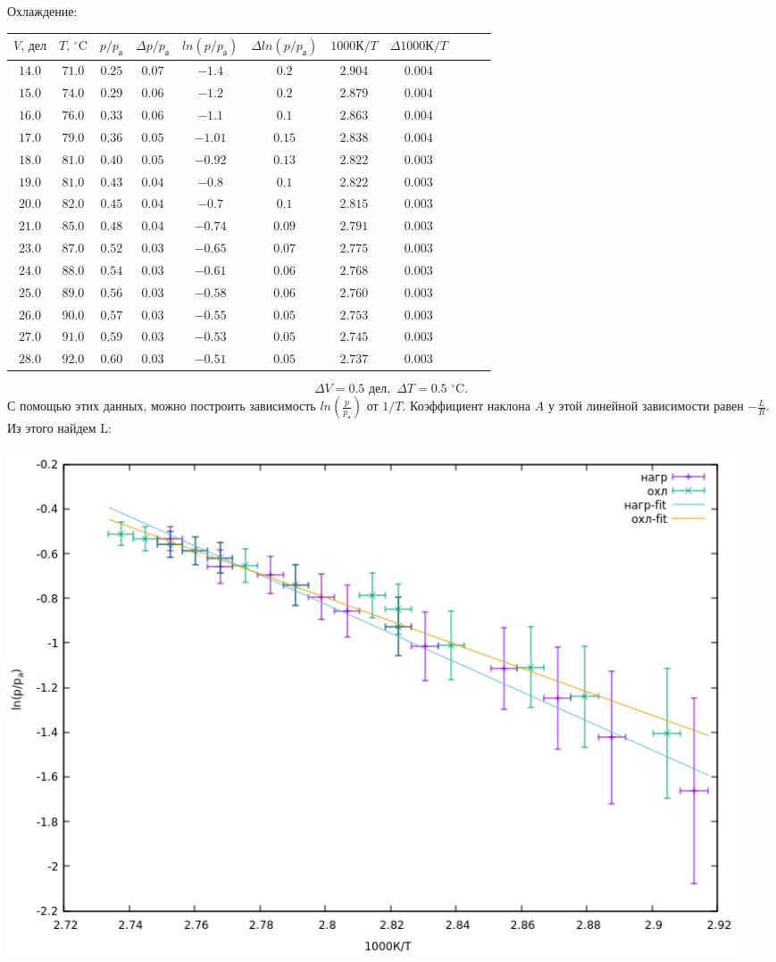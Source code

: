 Охлаждение:
\begin{center}
\begin{tabular}{|c|c|c|c|c|c|c|c|c|c|c|}\hline
$V,\,\text{дел}$&$T,\,^\circ\text{C}$&$p/p_\text{а}$&$\Delta p/p_\text{а}$
&$ln(p/p_\text{а})$&$\Delta ln(p/p_\text{а})$
&$1000\text{К}/T$&$\Delta 1000\text{К}/T$
\\ \hline
$14.0$&$71.0$&$0.25$&$0.07$&$-1.4$&$0.2$&$2.904$&$0.004$\\ \hline
$15.0$&$74.0$&$0.29$&$0.06$&$-1.2$&$0.2$&$2.879$&$0.004$\\ \hline
$16.0$&$76.0$&$0.33$&$0.06$&$-1.1$&$0.1$&$2.863$&$0.004$\\ \hline
$17.0$&$79.0$&$0.36$&$0.05$&$-1.01$&$0.15$&$2.838$&$0.004$\\ \hline
$18.0$&$81.0$&$0.40$&$0.05$&$-0.92$&$0.13$&$2.822$&$0.003$\\ \hline
$19.0$&$81.0$&$0.43$&$0.04$&$-0.8$&$0.1$&$2.822$&$0.003$\\ \hline
$20.0$&$82.0$&$0.45$&$0.04$&$-0.7$&$0.1$&$2.815$&$0.003$\\ \hline
$21.0$&$85.0$&$0.48$&$0.04$&$-0.74$&$0.09$&$2.791$&$0.003$\\ \hline
$23.0$&$87.0$&$0.52$&$0.03$&$-0.65$&$0.07$&$2.775$&$0.003$\\ \hline
$24.0$&$88.0$&$0.54$&$0.03$&$-0.61$&$0.06$&$2.768$&$0.003$\\ \hline
$25.0$&$89.0$&$0.56$&$0.03$&$-0.58$&$0.06$&$2.760$&$0.003$\\ \hline
$26.0$&$90.0$&$0.57$&$0.03$&$-0.55$&$0.05$&$2.753$&$0.003$\\ \hline
$27.0$&$91.0$&$0.59$&$0.03$&$-0.53$&$0.05$&$2.745$&$0.003$\\ \hline
$28.0$&$92.0$&$0.60$&$0.03$&$-0.51$&$0.05$&$2.737$&$0.003$\\ \hline
\end{tabular}
\end{center}
$$\Delta V=0.5\,\,\text{дел},\,\,\Delta T=0.5\,\,^\circ\text{C}.$$
С помощью этих данных, можно построить зависимость $ln(\frac{p}{p_\text{а}})$ от $1/T$. Коэффициент наклона $A$ у этой линейной зависимости равен $-\frac{L}{R}$. Из этого найдем L:
\begin{center}
\includegraphics[width=0.95\textwidth]{plot_1.png}
\end{center}
